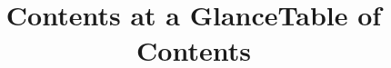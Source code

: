 

    \title{Contents at a Glance}
    \placelist[chapter]

    \title{Table of Contents}
    \placecontent

